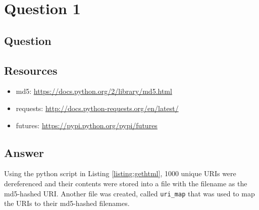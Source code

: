 \section{Question 1}

\subsection{Question}


\subsection{Resources}
\begin{itemize}
\item md5: \url{https://docs.python.org/2/library/md5.html}
\item requests: \url{http://docs.python-requests.org/en/latest/}
\item futures: \url{https://pypi.python.org/pypi/futures}
\end{itemize}

\subsection{Answer}
Using the python script in Listing \ref{listing:gethtml}, 1000 unique URIs were dereferenced and
their contents were stored into a file with the filename as the md5-hashed URI. Another file was created,
called {\tt uri\_map} that was used to map the URIs to their md5-hashed filenames.

\newpage
